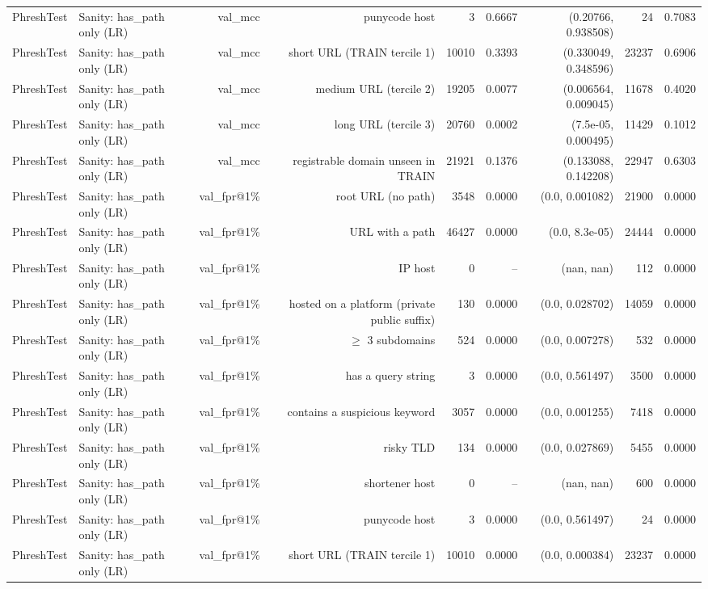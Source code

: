 \begin{table}[t]
\begin{tabular}{llrrrrrrr}
PhreshTest & Sanity: has\_path only (LR) & val\_mcc & punycode host & 3 & 0.6667 & (0.20766, 0.938508) & 24 & 0.7083 \\
PhreshTest & Sanity: has\_path only (LR) & val\_mcc & short URL (TRAIN tercile 1) & 10010 & 0.3393 & (0.330049, 0.348596) & 23237 & 0.6906 \\
PhreshTest & Sanity: has\_path only (LR) & val\_mcc & medium URL (tercile 2) & 19205 & 0.0077 & (0.006564, 0.009045) & 11678 & 0.4020 \\
PhreshTest & Sanity: has\_path only (LR) & val\_mcc & long URL (tercile 3) & 20760 & 0.0002 & (7.5e-05, 0.000495) & 11429 & 0.1012 \\
PhreshTest & Sanity: has\_path only (LR) & val\_mcc & registrable domain unseen in TRAIN & 21921 & 0.1376 & (0.133088, 0.142208) & 22947 & 0.6303 \\
PhreshTest & Sanity: has\_path only (LR) & val\_fpr@1\% & root URL (no path) & 3548 & 0.0000 & (0.0, 0.001082) & 21900 & 0.0000 \\
PhreshTest & Sanity: has\_path only (LR) & val\_fpr@1\% & URL with a path & 46427 & 0.0000 & (0.0, 8.3e-05) & 24444 & 0.0000 \\
PhreshTest & Sanity: has\_path only (LR) & val\_fpr@1\% & IP host & 0 & -- & (nan, nan) & 112 & 0.0000 \\
PhreshTest & Sanity: has\_path only (LR) & val\_fpr@1\% & hosted on a platform (private public suffix) & 130 & 0.0000 & (0.0, 0.028702) & 14059 & 0.0000 \\
PhreshTest & Sanity: has\_path only (LR) & val\_fpr@1\% & $\geq$ 3 subdomains & 524 & 0.0000 & (0.0, 0.007278) & 532 & 0.0000 \\
PhreshTest & Sanity: has\_path only (LR) & val\_fpr@1\% & has a query string & 3 & 0.0000 & (0.0, 0.561497) & 3500 & 0.0000 \\
PhreshTest & Sanity: has\_path only (LR) & val\_fpr@1\% & contains a suspicious keyword & 3057 & 0.0000 & (0.0, 0.001255) & 7418 & 0.0000 \\
PhreshTest & Sanity: has\_path only (LR) & val\_fpr@1\% & risky TLD & 134 & 0.0000 & (0.0, 0.027869) & 5455 & 0.0000 \\
PhreshTest & Sanity: has\_path only (LR) & val\_fpr@1\% & shortener host & 0 & -- & (nan, nan) & 600 & 0.0000 \\
PhreshTest & Sanity: has\_path only (LR) & val\_fpr@1\% & punycode host & 3 & 0.0000 & (0.0, 0.561497) & 24 & 0.0000 \\
PhreshTest & Sanity: has\_path only (LR) & val\_fpr@1\% & short URL (TRAIN tercile 1) & 10010 & 0.0000 & (0.0, 0.000384) & 23237 & 0.0000 \\

\end{tabular}
\end{table}

